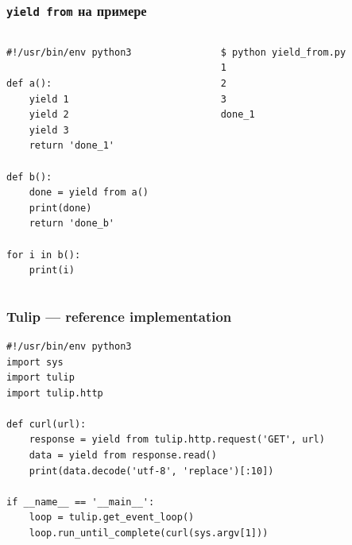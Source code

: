 \documentclass[aspectratio=169]{beamer}
\begin{document}
\begin{frame}[fragile]
  \frametitle{{\tt yield from} на примере}


  \begin{columns}
    \begin{column}{.48\textwidth}
      \begin{lstlisting}[caption=yield\_from.py]
#!/usr/bin/env python3

def a():
    yield 1
    yield 2
    yield 3
    return 'done_1'

def b():
    done = yield from a()
    print(done)
    return 'done_b'

for i in b():
    print(i)
      \end{lstlisting}

    \end{column}%
    \hfill%
    
    \begin{column}{.48\textwidth}
      \begin{lstlisting}[numbers=none]
$ python yield_from.py 
1
2
3
done_1
      \end{lstlisting}

    \end{column}%
  \end{columns}

\end{frame}


\begin{frame}[fragile]
  \frametitle{Tulip --- reference implementation}
  \begin{lstlisting}
#!/usr/bin/env python3
import sys
import tulip
import tulip.http

def curl(url):
    response = yield from tulip.http.request('GET', url)
    data = yield from response.read()
    print(data.decode('utf-8', 'replace')[:10])

if __name__ == '__main__':
    loop = tulip.get_event_loop()
    loop.run_until_complete(curl(sys.argv[1]))
  \end{lstlisting}
\end{frame}
\end{document}
